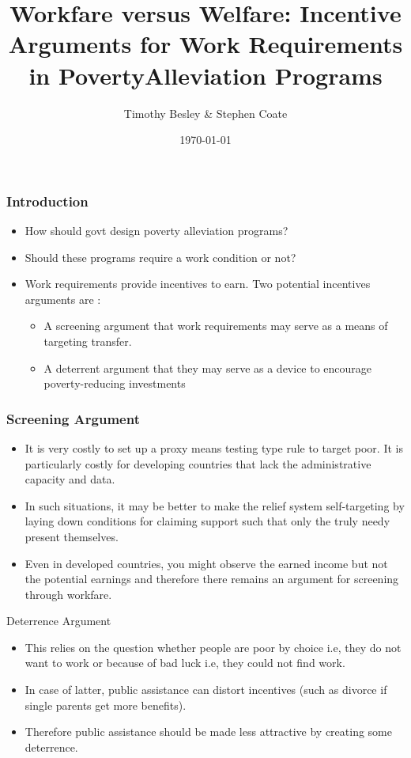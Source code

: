 \documentclass{beamer}
\begin{document}
\title{Workfare versus Welfare: Incentive Arguments for Work Requirements in PovertyAlleviation Programs}
\author{Timothy Besley \& Stephen Coate}
\date{\today}

\frame{\titlepage}


\begin{frame}
\frametitle{Introduction}
\begin{itemize}
\item How should govt design poverty alleviation programs? 
\item Should these programs require a work condition or not?
\item Work requirements provide incentives to earn. Two potential incentives arguments are :
\begin{itemize}
    \item A screening argument that work requirements may serve as a means of targeting transfer.
    \item A deterrent argument that they may serve as a device to encourage poverty-reducing investments
\end{itemize}
\end{itemize}
\end{frame}

\begin{frame}
\frametitle{Screening Argument }
\begin{itemize}
    \item It is very costly to set up a proxy means testing type rule to target poor. It is particularly costly for developing countries that lack the administrative capacity and data.
    \item In such situations, it may be better to make the relief system self-targeting by laying down conditions for claiming support such that only the truly needy present themselves.
    \item Even in developed countries, you might observe the earned income but not the potential earnings and therefore there remains an argument for screening through workfare. 
  
\end{itemize}
\end{frame}

\begin{frame}{Deterrence Argument}
\begin{itemize}
    \item This relies on the question whether people are poor by choice i.e, they do not want to work or because of bad luck i.e, they could not find work. 
    \item In case of latter, public assistance can distort incentives (such as divorce if single parents get more benefits). 
    \item Therefore public assistance should be made less attractive by creating some deterrence. 
\end{itemize}
\end{frame}
\end{document}
